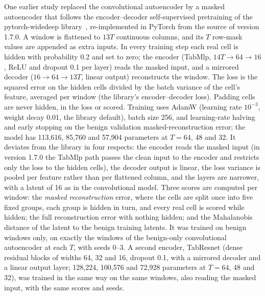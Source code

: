 One earlier study replaced the convolutional autoencoder by a masked autoencoder that follows the encoder--decoder
self-supervised pretraining of the pytorch-widedeep library~\cite{zaurin2023widedeep,widedeepdocs},
re-implemented in PyTorch from the source of version 1.7.0. A window is flattened to $13T$ continuous columns, and
its $T$ row-mask values are appended as extra inputs. In every training step each real cell is hidden with
probability 0.2 and set to zero; the encoder (TabMlp, $14T{\to}64{\to}16$, ReLU and dropout 0.1 per layer) reads
the masked input, and a mirrored decoder ($16{\to}64{\to}13T$, linear output) reconstructs the window. The loss is
the squared error on the hidden cells divided by the batch variance of the cell's feature, averaged per window
(the library's encoder--decoder loss). Padding cells are never hidden, in the loss or scored. Training uses AdamW
(learning rate $10^{-3}$, weight decay 0.01, the library default), batch size 256, and learning-rate halving and
early stopping on the benign validation masked-reconstruction error; the model has 113{,}616, 85{,}760 and
57{,}904 parameters at $T=64$, 48 and 32. It deviates from the library in four respects: the encoder reads the
masked input (in version 1.7.0 the TabMlp path passes the clean input to the encoder and restricts only the loss
to the hidden cells), the decoder output is linear, the loss variance is pooled per feature rather than per
flattened column, and the layers are narrower, with a latent of 16 as in the convolutional model. Three scores are
computed per window: the \emph{masked reconstruction} error, where the cells are split once into five fixed
groups, each group is hidden in turn, and every real cell is scored while hidden; the full reconstruction error
with nothing hidden; and the Mahalanobis distance of the latent to the benign training latents. It was trained on
benign windows only, on exactly the windows of the benign-only convolutional autoencoder at each $T$, with
seeds 0--3. A second encoder, TabResnet (dense residual blocks of widths 64, 32 and 16, dropout 0.1, with a
mirrored decoder and a linear output layer; 128{,}224, 100{,}576 and 72{,}928 parameters at $T=64$, 48 and 32),
was trained in the same way on the same windows, also reading the masked input, with the same scores and seeds.
